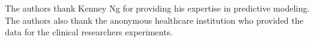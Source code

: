 The authors thank Kenney Ng for providing
his expertise in predictive modeling.
The authors also thank the anonymous healthcare institution
who provided the data for the clinical researchers experiments.
